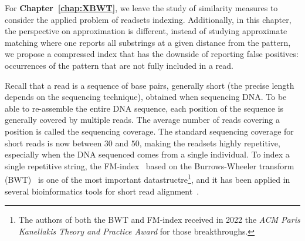 For \textbf{Chapter~\ref{chap:XBWT}}, we leave the study of similarity measures to consider the applied problem of readsets indexing. 
Additionally, in this chapter, the perspective on approximation is different, instead of studying approximate matching where one reports all substrings at a given distance from the pattern, we propose a compressed index that has the downside of reporting false positives: occurrences of the pattern that are not fully included in a read.

Recall that a read is a sequence of base pairs, generally short (the precise length depends on the sequencing technique), obtained when sequencing DNA. To be able to re-assemble the entire DNA sequence, each position of the sequence is generally covered by multiple reads. The average number of reads covering a position is called the sequencing coverage.
The standard sequencing coverage for short reads is now between $30$ and $50$, making the readsets highly repetitive, especially when the DNA sequenced comes from a single individual.
To index a single repetitive string, the FM-index~\cite{ferragina2005indexing} based on the Burrows-Wheeler transform (BWT)~\cite{burrows1994block} is one of the most important datastructre\footnote{The authors of both the BWT and FM-index received in 2022 the \textit{ACM Paris Kanellakis Theory and Practice Award} for those breakthroughs.}, and it has been applied in several bioinformatics tools for short read alignment~\cite{langmead2009ultrafast,langmead2012fast,li2009fast}.

